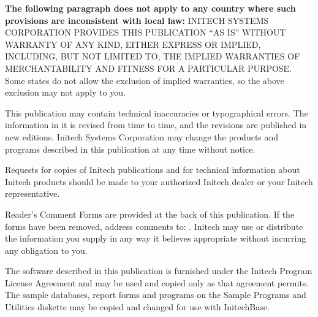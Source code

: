 \begin{TitleVerso}
{\imLegalFont
\textbf{The following paragraph does not apply to any country where such
provisions are inconsistent with local law:} INITECH SYSTEMS CORPORATION
PROVIDES THIS PUBLICATION ``AS IS'' WITHOUT WARRANTY OF ANY KIND, EITHER
EXPRESS OR IMPLIED, INCLUDING, BUT NOT LIMITED TO, THE IMPLIED WARRANTIES OF
MERCHANTABILITY AND FITNESS FOR A PARTICULAR PURPOSE.  Some states do not
allow the exclusion of implied warranties, so the above exclusion may not
apply to you.\par
This publication may contain technical inaccuracies or typographical errors.
The information in it is revised from time to time, and the revisions are
published in new editions.  Initech Systems Corporation may change the
products and programs described in this publication at any time without
notice.\par
Requests for copies of Initech publications and for technical information
about Initech products should be made to your authorized Initech dealer or
your Initech representative.\par}

{\footnotesize
Reader's Comment Forms are provided at the back of this publication.  If the
forms have been removed, address comments to: \InitechAddressLine.
Initech may use or distribute the information you supply in any way it
believes appropriate without incurring any obligation to you.\par
The software described in this publication is furnished under the Initech
Program License Agreement and may be used and copied only as that agreement
permits.  The sample databases, report forms and programs on the Sample
Programs and Utilities diskette may be copied and changed for use with
InitechBase.\par}
\IsThisGoodForTheCompany
\end{TitleVerso}

